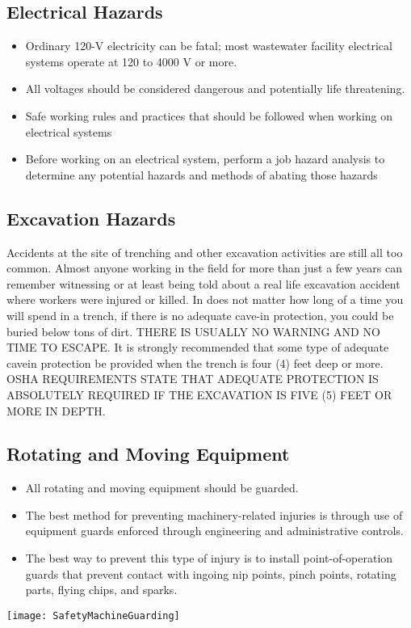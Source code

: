 \begin{itemize}
\subsection{Electrical Hazards}
\begin{itemize}
\item Ordinary 120-V electricity can be fatal; most wastewater facility electrical systems operate at 120 to 4000 V or more.  
\item All voltages should be considered dangerous and potentially life threatening.  
\item Safe working rules and practices that should be followed when working on electrical systems
\item Before working on an electrical system, perform a job hazard analysis to determine any potential hazards and methods of abating those hazards
\end{itemize}

\subsection{Excavation Hazards}
Accidents at the site of trenching and other excavation
activities are still all too common. Almost anyone working
in the field for more than just a few years can remember
witnessing or at least being told about a real life excavation
accident where workers were injured or killed. In does not
matter how long of a time you will spend in a trench, if
there is no adequate cave-in protection, you could be buried
below tons of dirt. THERE IS USUALLY NO WARNING
AND NO TIME TO ESCAPE.
It is strongly recommended that some type of adequate cavein
protection be provided when the trench is four (4) feet
deep or more. OSHA REQUIREMENTS STATE THAT
ADEQUATE PROTECTION IS ABSOLUTELY
REQUIRED IF THE EXCAVATION IS FIVE (5) FEET
OR MORE IN DEPTH.

\subsection{Rotating and Moving Equipment}

\begin{itemize}
\item All rotating and moving equipment should be guarded. 
\item The best method for preventing machinery-related injuries is through use of equipment guards enforced through engineering and administrative controls.   
\item The best way to prevent this type of injury is to install point-of-operation guards that prevent contact with ingoing nip points, pinch points, rotating parts, flying chips, and sparks.
\end{itemize}
\begin{center}
\texttt{[image: SafetyMachineGuarding]}\\
\end{center}


\end{itemize}
